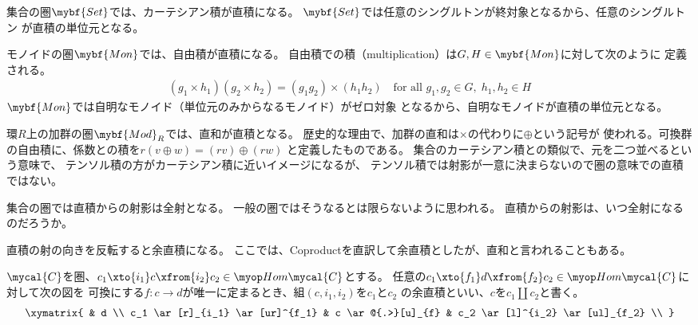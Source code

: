 	\begin{description}\setlength{\itemsep}{-1mm} %
		\item[集合の圏] 集合の圏$\mybf{Set}$では、カーテシアン積が直積になる。
		$\mybf{Set}$では任意のシングルトンが終対象となるから、任意のシングルトン
		が直積の単位元となる。
		\item[モノイドの圏] モノイドの圏$\mybf{Mon}$では、自由積が直積になる。
		自由積での積（multiplication）は$G,H\in\mybf{Mon}$に対して次のように
		定義される。
		\begin{equation*}\begin{split} %
			(g_1\times h_1)(g_2\times h_2) = (g_1g_2)\times(h_1h_2)
			\quad\text{for all }g_1,g_2\in G,\;h_1,h_2\in H
		\end{split}\end{equation*} %
		$\mybf{Mon}$では自明なモノイド（単位元のみからなるモノイド）がゼロ対象
		となるから、自明なモノイドが直積の単位元となる。
		\item[加群] 環$R$上の加群の圏$\mybf{Mod}_R$では、直和が直積となる。
		歴史的な理由で、加群の直和は$\times$の代わりに$\oplus$という記号が
		使われる。可換群の自由積に、係数との積を$r(v\oplus w)=(rv)\oplus(rw)$
		と定義したものである。
		集合のカーテシアン積との類似で、元を二つ並べるという意味で、
		テンソル積の方がカーテシアン積に近いイメージになるが、
		テンソル積では射影が一意に決まらないので圏の意味での直積ではない。
	\end{description} %

	\begin{todo}[射影と全射]\label{todo:射影と全射} %
		集合の圏では直積からの射影は全射となる。
		一般の圏ではそうなるとは限らないように思われる。
		直積からの射影は、いつ全射になるのだろうか。
	\end{todo} %

	直積の射の向きを反転すると余直積になる。
	ここでは、Coproductを直訳して余直積としたが、直和と言われることもある。

	\begin{definition}\label{def:余直積} %
		$\mycal{C}$を圏、$c_1\xto{i_1}c\xfrom{i_2}c_2\in\Hom\mycal{C}$とする。
		任意の$c_1\xto{f_1}d\xfrom{f_2}c_2\in\Hom\mycal{C}$に対して次の図を
		可換にする$f:c\to d$が唯一に定まるとき、組$(c,i_1,i_2)$を$c_1$と$c_2$
		の余直積といい、$c$を$c_1\coprod c_2$と書く。
		\begin{equation*}\xymatrix{
			& d  \\
			c_1 \ar[r]_{i_1} \ar[ur]^{f_1} & c \ar@{.>}[u]_{f} 
				& c_2 \ar[l]^{i_2} \ar[ul]_{f_2} \\
		}\end{equation*}
	\end{definition} %
\endgroup %
